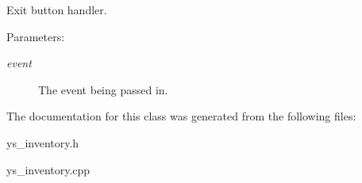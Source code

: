 Exit button handler. 

\begin{Desc}
\item[Parameters:]
\begin{description}
\item[{\em event}]The event being passed in. \end{description}
\end{Desc}


The documentation for this class was generated from the following files:\begin{CompactItemize}
\item 
ys\_\-inventory.h\item 
ys\_\-inventory.cpp\end{CompactItemize}
